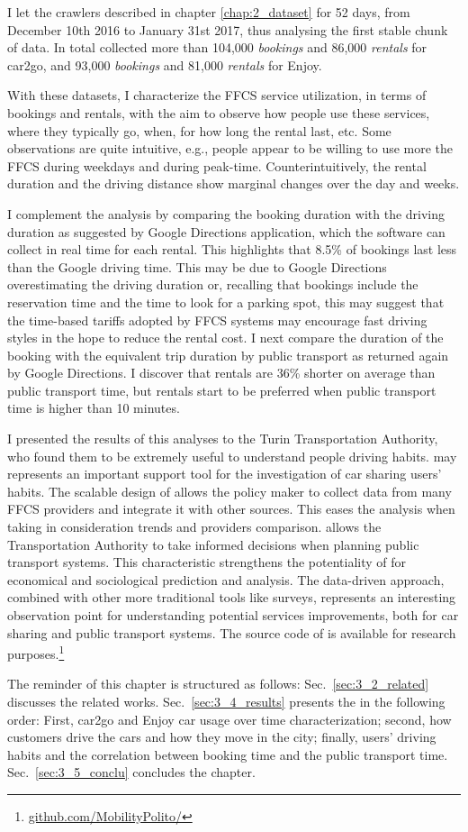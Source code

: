 I let the crawlers described in chapter \ref{chap:2_dataset} for 52 days,  from December 10th 2016 to January 31st 2017, thus analysing the first stable chunk of data. In total \tool collected more than 104,000 \textit{bookings} and 86,000 \textit{rentals} for car2go, and 93,000 \textit{bookings} and 81,000 \textit{rentals} for Enjoy. 

With these datasets, I characterize the FFCS service utilization, in terms of bookings and rentals, with the aim to observe how people use these services, where they typically go, when, for how long the rental last, etc. Some observations are quite intuitive, e.g., people appear to be willing to use more the FFCS during weekdays and during peak-time. Counterintuitively, the rental duration and the driving distance show marginal changes over the day and weeks.

I complement the analysis by comparing the booking duration with the driving duration as suggested by Google Directions application, which the software can collect in real time for each rental. This highlights that 8.5\% of bookings last less than the Google driving time. 
This may be due to Google Directions overestimating the driving duration or, recalling that bookings  include the reservation time and the time to look for a parking spot, this may suggest that the time-based tariffs adopted by FFCS systems may encourage fast driving styles in the hope to reduce the rental cost.
I next compare the duration of the booking with the equivalent trip duration by public transport as returned again by Google Directions. I discover that rentals are 36\% shorter on average than public transport time, but  rentals start to be preferred when public transport time is higher than 10 minutes.

I presented the results of this analyses to the Turin Transportation Authority, who found them to be extremely useful to understand people driving habits. \tool may represents an important support tool for the investigation of car sharing users' habits. The scalable design of \tool allows the policy maker to collect data from many FFCS providers  and integrate it with other sources. This eases the analysis when taking in consideration trends and providers comparison. \tool allows the Transportation Authority to take informed decisions when planning public transport systems. This characteristic strengthens the potentiality of \tool for economical and sociological prediction and analysis. The data-driven approach, combined with other more traditional tools like surveys, represents an interesting observation point for understanding potential services improvements, both for car sharing and public transport systems. The source code of \tool  is available for research purposes.\footnote{\url{github.com/MobilityPolito/}}

The reminder of this chapter is structured as follows: Sec.~\ref{sec:3_2_related} discusses the related works. Sec.~\ref{sec:3_4_results} presents the in the following order: First, car2go and Enjoy car usage over time characterization; second, how customers drive the cars and how they move in the city; finally, users' driving habits and the correlation between booking time and the public transport time. Sec.~\ref{sec:3_5_conclu} concludes the chapter.


